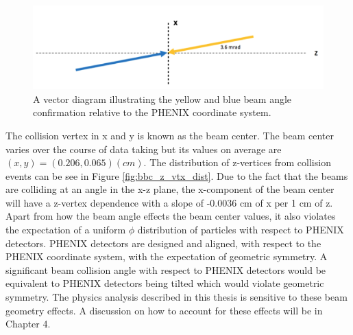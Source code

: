 \begin{figure}[h!]
\begin{center}
\includegraphics[width=0.85\linewidth]{figs/beam_angle.png}
\caption{A vector diagram illustrating the yellow and blue beam angle confirmation relative to the PHENIX coordinate system.}\label{fig:beam_angle}
\end{center}
\end{figure}

The collision vertex in x and y is known as the beam center. The beam center varies over the course of data taking but its values on average are $(x,y) = (0.206,0.065) (cm)$. The distribution of z-vertices from collision events can be see in Figure \ref{fig:bbc_z_vtx_dist}. Due to the fact that the beams are colliding at an angle in the x-z plane, the x-component of the beam center will have a z-vertex dependence with a slope of -0.0036 cm of x per 1 cm of z.
Apart from how the beam angle effects the beam center values, it also violates the expectation of a uniform $\phi$ distribution of particles with respect to PHENIX detectors. PHENIX detectors are designed and aligned, with respect to the PHENIX coordinate system, with the expectation of geometric symmetry. A significant beam collision angle with respect to PHENIX detectors would be equivalent to PHENIX detectors being tilted which would violate geometric symmetry.
The physics analysis described in this thesis is sensitive to these beam geometry effects. A discussion on how to account for these effects will be in Chapter 4.


